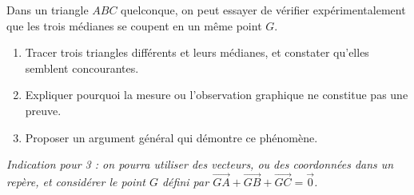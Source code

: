 Dans un triangle $ABC$ quelconque, on peut essayer de vérifier
expérimentalement que les trois médianes se coupent en un même point $G$.
\begin{enumerate}
  \item Tracer trois triangles différents et leurs médianes, et constater
  qu'elles semblent concourantes.
  \item Expliquer pourquoi la mesure ou l'observation graphique ne constitue
  pas une preuve.
  \item Proposer un argument général qui démontre ce phénomène.
\end{enumerate}
\emph{Indication pour 3 : on pourra utiliser des vecteurs, ou des
coordonnées dans un repère, et considérer le point $G$ défini par
$\overrightarrow{GA} + \overrightarrow{GB} + \overrightarrow{GC} = \vec 0$.}
